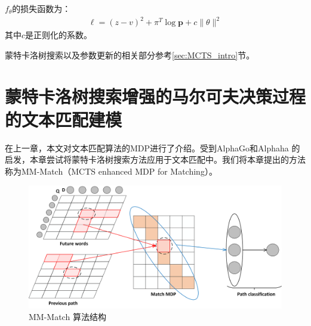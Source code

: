 $f_\theta$的损失函数为：
\begin{equation}
\label{eq:theta}
\begin{aligned}
\ell = (z-v)^2 + \pi^T\log \mathbf{p} + c\|\theta\|^2
\end{aligned}
\end{equation}
其中$c$是正则化的系数。

蒙特卡洛树搜索以及参数更新的相关部分参考\ref{sec:MCTS_intro}节。

\section{蒙特卡洛树搜索增强的马尔可夫决策过程的文本匹配建模}
在上一章，本文对文本匹配算法的MDP进行了介绍。受到AlphaGo和Alphaha  的启发，本章尝试将蒙特卡洛树搜索方法应用于文本匹配中。我们将本章提出的方法称为MM-Match（MCTS enhanced MDP for Matching）。

\begin{figure}[!htbp]
\vspace{1em}
\centering
  \includegraphics[width=0.9\linewidth]{figures/grid}
  \caption{MM-Match 算法结构}
  \label{fig:MCTS_sum}       %
\vspace{1em}
\end{figure}

